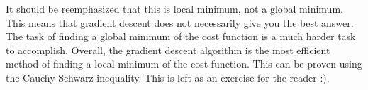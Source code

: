 It should be reemphasized that this is local minimum, not a global minimum. This means that gradient descent does not necessarily give you the best answer. The task of finding a global minimum of the cost function is a much harder task to accomplish. Overall, the gradient descent algorithm is the most efficient method of finding a local minimum of the cost function. This can be proven using the Cauchy-Schwarz inequality. This is left as an exercise for the reader :). 

